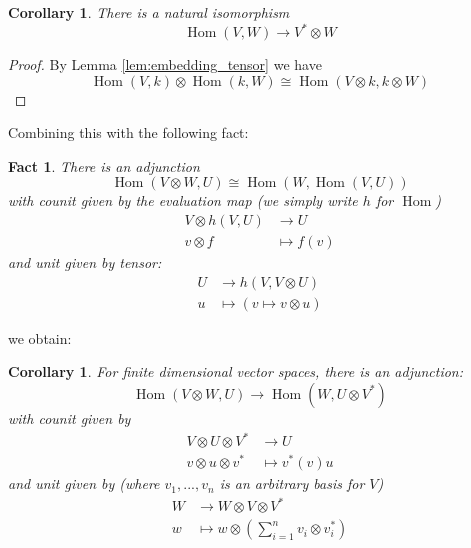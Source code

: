 \documentclass[12pt]{article}
\theoremstyle{plain}
\newtheorem{fact}[thm]{Fact}
\newtheorem{cor}[thm]{Corollary}
\theoremstyle{definition}
\newcommand{\lto}{\longrightarrow}
\begin{document}
\begin{cor}
There is a natural isomorphism
\begin{equation}
\operatorname{Hom}(V,W) \lto V^\ast \otimes W
\end{equation}
\end{cor}
\begin{proof}
By Lemma \ref{lem:embedding_tensor} we have
\begin{equation}
\operatorname{Hom}(V, k) \otimes \operatorname{Hom}(k, W) \cong \operatorname{Hom}(V \otimes k, k\otimes W)
\end{equation}
\end{proof}
Combining this with the following fact:
\begin{fact}
There is an adjunction
\begin{equation}
\operatorname{Hom}(V \otimes W, U) \cong \operatorname{Hom}(W, \operatorname{Hom}(V,U))
\end{equation}
with counit given by the evaluation map (we simply write $h$ for $\operatorname{Hom}$)
\begin{align*}
V \otimes h(V,U) &\lto U\\
v \otimes f &\longmapsto f(v)
\end{align*}
and unit given by tensor:
\begin{align*}
U &\lto h(V,V \otimes U)\\
u &\longmapsto (v \mapsto v \otimes u)
\end{align*}
\end{fact}
we obtain:
\begin{cor}
For finite dimensional vector spaces, there is an adjunction:
\begin{equation}\label{eq:tensor_dual_adjunction}
\operatorname{Hom}(V \otimes W, U) \lto \operatorname{Hom}(W, U \otimes V^\ast)
\end{equation}
with counit given by
\begin{align*}
V \otimes U \otimes V^\ast &\lto U\\
v \otimes u \otimes v^\ast &\longmapsto v^\ast(v)u
\end{align*}
and unit given by (where $v_1,...,v_n$ is an arbitrary basis for $V$)
\begin{align*}
W &\lto W \otimes V \otimes V^\ast\\
w &\longmapsto w \otimes (\sum_{i = 1}^n v_i \otimes v_i^\ast)
\end{align*}
\end{cor}
\end{document}
